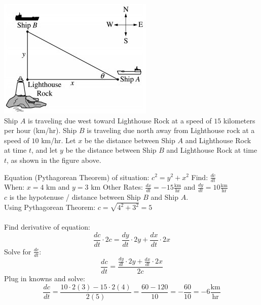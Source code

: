 \documentclass[12pt,letterpaper, onecolumn]{exam}
\begin{document}
\begin{questions}
		\question \includegraphics[width=0.7\linewidth]{Question04-001} \\ 
		Ship $A$ is traveling due west toward Lighthouse Rock at a speed of $15$ kilometers per hour (km/hr). Ship $B$ is traveling due north away from Lighthouse rock at a speed of $10$ km/hr. Let $x$ be the distance between Ship $A$ and Lighthouse Rock at time $t$, and let $y$ be the distance between Ship $B$ and Lighthouse Rock at time $t$, as shown in the figure above.
		\pagebreak
			\begin{solution}
				\vfill
				Equation (Pythagorean Theorem) of situation: $c^2=y^2+x^2$
				Find: $\frac{dc}{dt}$ \\
				When: $x=4$ km and $y=3$ km
				Other Rates: $\frac{dx}{dt} = -15 \frac{\text{km}}{\text{hr}}$ and $\frac{dy}{dt} = 10 \frac{\text{km}}{\text{hr}}$ \\
				$c$ is the hypotenuse / distance between Ship $B$ and Ship $A$. \\
				Using Pythagorean Theorem: $ c = \sqrt{4^2 + 3^2} = 5 $ \\ \\ 
				Find derivative of equation:
				$$\frac{dc}{dt} \cdot 2c = \frac{dy}{dt} \cdot 2y + \frac{dx}{dt} \cdot 2x$$
				Solve for $\frac{dc}{dt}$:
				$$\frac{dc}{dt}  = \frac{\frac{dy}{dt} \cdot 2y + \frac{dx}{dt} \cdot 2x}{2c}$$
				Plug in knowns and solve:
				$$\frac{dc}{dt}  = \frac{10 \cdot 2(3) - 15 \cdot 2(4)}{2(5)} = \frac{60-120}{10} = - \frac{60}{10} = \boxed{-6 \frac{\text{km}}{\text{hr}}}$$
			\end{solution}
		\question
		\question
		\question
		\question
		\question
		\question
		\question
		\question
		\question
		\question
	\end{questions}
\end{document}
